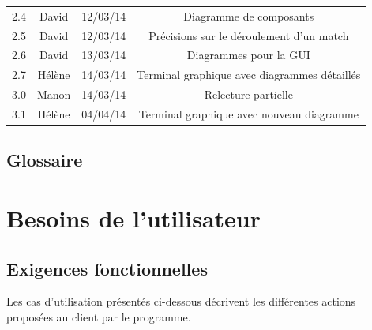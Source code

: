 \documentclass[a4paper,titlepage]{scrreprt}
\begin{document}
\begin{tabular}{|c|c|c|c|}
    2.4 & David & 12/03/14 & Diagramme de composants \\
    2.5 & David & 12/03/14 & Précisions sur le déroulement d'un match \\
    2.6 & David & 13/03/14 & Diagrammes pour la GUI \\
    2.7 & Hélène & 14/03/14 & Terminal graphique avec diagrammes détaillés\\
    3.0 & Manon & 14/03/14 & Relecture partielle \\
    3.1 & Hélène & 04/04/14 & Terminal graphique avec nouveau diagramme\\
    \hline
  \end{tabular}


\section{Glossaire}
  \removepagebreak
  \printglossaries
  \restorepagebreak
\chapter{Besoins de l'utilisateur}
  
  
\section{Exigences fonctionnelles}
  
  Les cas d'utilisation présentés ci-dessous décrivent les différentes actions proposées au client par le programme.
\end{document}

